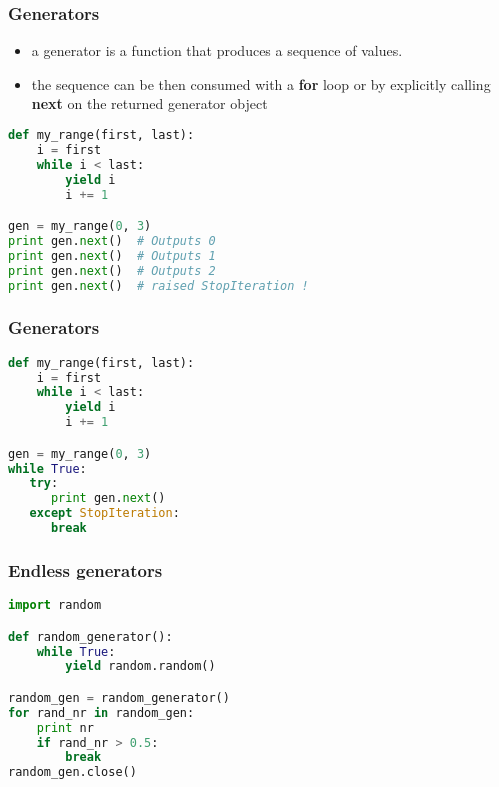 \documentclass{beamer}
\begin{document}
\begin{frame}[fragile]
\frametitle{Generators}
\begin{itemize}
  \item a generator is a function that produces a sequence of values.
  \item the sequence can be then consumed with a {\bf for} loop or by explicitly
    calling {\bf next} on the returned generator object
\end{itemize}
\vspace{5 mm}
\begin{lstlisting}[language=python]
def my_range(first, last):
    i = first
    while i < last:
        yield i
        i += 1

gen = my_range(0, 3)
print gen.next()  # Outputs 0
print gen.next()  # Outputs 1
print gen.next()  # Outputs 2
print gen.next()  # raised StopIteration !
\end{lstlisting}
\end{frame}

\begin{frame}[fragile]
\frametitle{Generators}
\vspace{5 mm}
\begin{lstlisting}[language=python]
def my_range(first, last):
    i = first
    while i < last:
        yield i
        i += 1

gen = my_range(0, 3)
while True:
   try:
      print gen.next()
   except StopIteration:
      break
\end{lstlisting}
\end{frame}

\begin{frame}[fragile]
\frametitle{Endless generators}
\vspace{5 mm}
\begin{lstlisting}[language=python]
import random

def random_generator():
    while True:
        yield random.random()

random_gen = random_generator()
for rand_nr in random_gen:
    print nr
    if rand_nr > 0.5:
        break
random_gen.close()
\end{lstlisting}
\end{frame}
\end{document}
